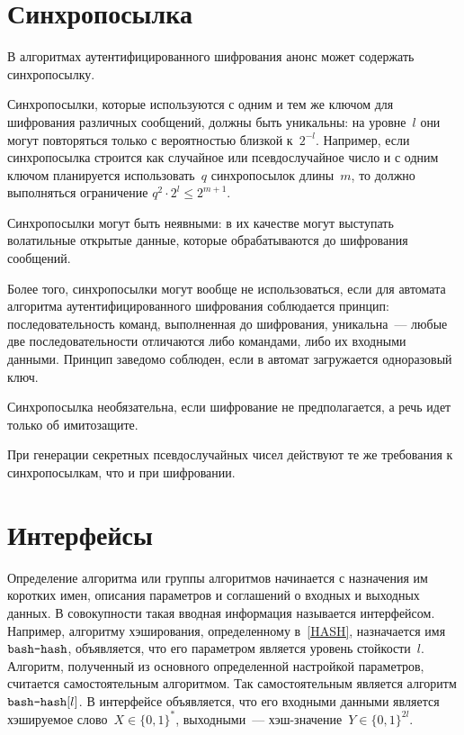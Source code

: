 \section{Синхропосылка}\label{COMMON.Nonce}

В алгоритмах аутентифицированного шифрования анонс может содержать 
синхропосылку.

Синхропосылки, которые используются с одним и тем же ключом для шифрования 
различных сообщений, должны быть уникальны: на уровне~$l$ они могут повторяться 
только с вероятностью близкой к~$2^{-l}$. Например, если синхропосылка строится 
как случайное или псевдослучайное число и с одним ключом планируется 
использовать~$q$ синхропосылок длины~$m$, то должно выполняться ограничение
$q^2\cdot 2^l\leq 2^{m+1}$.

Синхропосылки могут быть неявными: в их качестве могут выступать волатильные 
открытые данные, которые обрабатываются до шифрования сообщений.

Более того, синхропосылки могут вообще не использоваться, если 
для автомата алгоритма аутентифицированного шифрования
соблюдается принцип: последовательность команд, выполненная до шифрования, 
уникальна~--- любые две последовательности отличаются либо командами,
либо их входными данными.
%
Принцип заведомо соблюден, если в автомат загружается одноразовый ключ.

Синхропосылка необязательна, если шифрование не 
предполагается, а речь идет только об имитозащите.

При генерации секретных псевдослучайных чисел действуют те же требования к 
синхропосылкам, что и при шифровании.

\section{Интерфейсы}\label{COMMON.IFace}

Определение алгоритма или группы алгоритмов начинается с назначения им 
коротких имен, описания параметров и соглашений о входных и выходных данных.
В совокупности такая вводная информация называется интерфейсом.
%
Например, алгоритму хэширования, определенному в~\ref{HASH}, назначается
имя~$\texttt{bash-hash}$, объявляется, что его параметром является уровень
стойкости~$l$. 
%
Алгоритм, полученный из основного определенной настройкой параметров,
считается самостоятельным алгоритмом. Так самостоятельным является алгоритм 
$\texttt{bash-hash}[l]$. 
%
В интерфейсе объявляется, что его входными данными является хэшируемое 
слово~$X\in\{0,1\}^*$, выходными~--- хэш-значение~$Y\in\{0,1\}^{2l}$.

